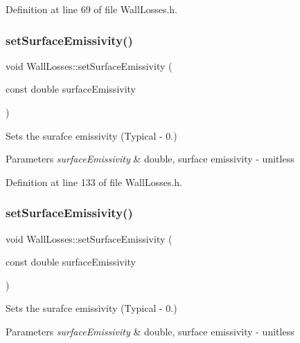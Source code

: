 Definition at line 69 of file Wall\+Losses.\+h.

\mbox{\label{class_wall_losses_ad0ebd1a0a1b32a2358da15b6c8e63d3a}} 
\subsubsection{\texorpdfstring{set\+Surface\+Emissivity()}{setSurfaceEmissivity()}\hspace{0.1cm}{\footnotesize\ttfamily [1/3]}}
{\footnotesize\ttfamily void Wall\+Losses\+::set\+Surface\+Emissivity (\begin{DoxyParamCaption}\item[{const double}]{surface\+Emissivity }\end{DoxyParamCaption})\hspace{0.3cm}{\ttfamily [inline]}}

Sets the surafce emissivity (Typical -\/ 0.) 
\begin{DoxyParams}{Parameters}
{\em surface\+Emissivity} & double, surface emissivity -\/ unitless \\
\hline
\end{DoxyParams}


Definition at line 133 of file Wall\+Losses.\+h.

\mbox{\label{class_wall_losses_ad0ebd1a0a1b32a2358da15b6c8e63d3a}} 
\subsubsection{\texorpdfstring{set\+Surface\+Emissivity()}{setSurfaceEmissivity()}\hspace{0.1cm}{\footnotesize\ttfamily [2/3]}}
{\footnotesize\ttfamily void Wall\+Losses\+::set\+Surface\+Emissivity (\begin{DoxyParamCaption}\item[{const double}]{surface\+Emissivity }\end{DoxyParamCaption})\hspace{0.3cm}{\ttfamily [inline]}}

Sets the surafce emissivity (Typical -\/ 0.) 
\begin{DoxyParams}{Parameters}
{\em surface\+Emissivity} & double, surface emissivity -\/ unitless \\
\hline
\end{DoxyParams}


